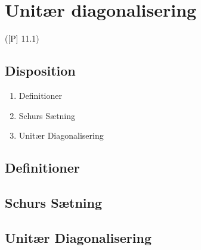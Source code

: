 \newpage
\chapter{Unitær diagonalisering}
([P] 11.1)

\section*{Disposition}
\begin{enumerate}
	\item Definitioner
	\item Schurs Sætning
	\item Unitær Diagonalisering
\end{enumerate}

\section{Definitioner}



\section{Schurs Sætning}


\section{Unitær Diagonalisering}

